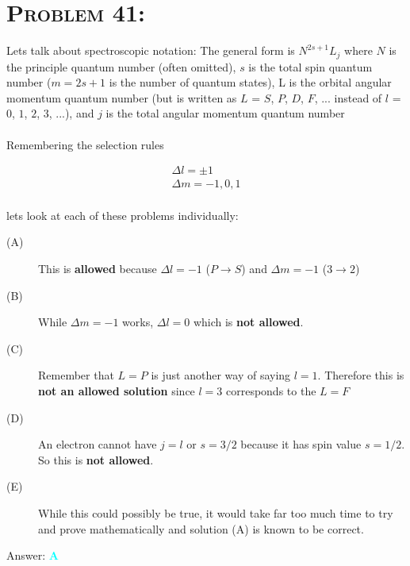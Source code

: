 \documentclass{article}
\begin{document}

\section{\textsc{Problem 41:}} Lets talk about spectroscopic notation: The general form is \textbf{$N^{2s+1}L_{j}$} where $N$ is the principle quantum number (often omitted), $s$ is the total spin quantum number ($m = 2s+1$ is the number of quantum states), L is the orbital angular momentum quantum number (but is written as  $L$ = $S$, $P$, $D$, $F$, ... instead of $l$ = $0$, $1$, $2$, $3$, ...), and $j$ is the total angular momentum quantum number\\
\\
Remembering the selection rules

\begin{gather}
\Delta l = \pm 1\\
\Delta m = -1 , 0 , 1
\end{gather}
\\
lets look at each of these problems individually:
\\
\begin{description}

\item[(A)] This is \textbf{allowed} because $\Delta l = -1$ ($P \rightarrow S$) and $\Delta m = -1$ ($3 \rightarrow 2$)

\item[(B)] While $\Delta m = -1$ works, $\Delta l = 0$ which is \textbf{not allowed}.

\item[(C)] Remember that $L = P$ is just another way of saying  $l = 1$. Therefore this is \textbf{not an allowed solution} since $l=3$ corresponds to the $L = F$

\item[(D)] An electron cannot have $j = l$ or $s= 3/2$ because it has spin value $s = 1/2$. So this is \textbf{not allowed}.

\item[(E)] While this could possibly be true, it would take far too much time to try and prove mathematically and solution (A) is known to be correct. 
\\
\end{description}

Answer: \textbf{\textcolor{cyan}A}\\

\end{document}
